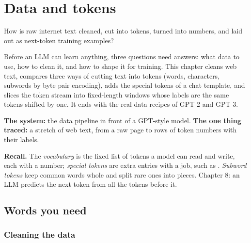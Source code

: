 \chapter{Data and tokens}
\label{ch:data}

\begin{question}
How is raw internet text cleaned, cut into tokens, turned into numbers, and laid out as next-token training examples?
\end{question}

\begin{whatfor}
Before an LLM can learn anything, three questions need answers: what data to use, how to clean it, and how to shape it for training. This chapter cleans web text, compares three ways of cutting text into tokens (words, characters, subwords by byte pair encoding), adds the special tokens of a chat template, and slices the token stream into fixed-length windows whose labels are the same tokens shifted by one. It ends with the real data recipes of GPT-2 and GPT-3.
\end{whatfor}

\begin{setup}
\textbf{The system:} the data pipeline in front of a GPT-style model.
\textbf{The one thing traced:} a stretch of web text, from a raw page to rows of token numbers with their labels.
\end{setup}

\begin{recall}
\textbf{Recall.} The \emph{vocabulary} is the fixed list of tokens a model can read and write, each with a number; \emph{special tokens} are extra entries with a job, such as . \emph{Subword tokens} keep common words whole and split rare ones into pieces. Chapter 8: an LLM predicts the next token from all the tokens before it.
\end{recall}

\section{Words you need}

\subsection*{Cleaning the data}

